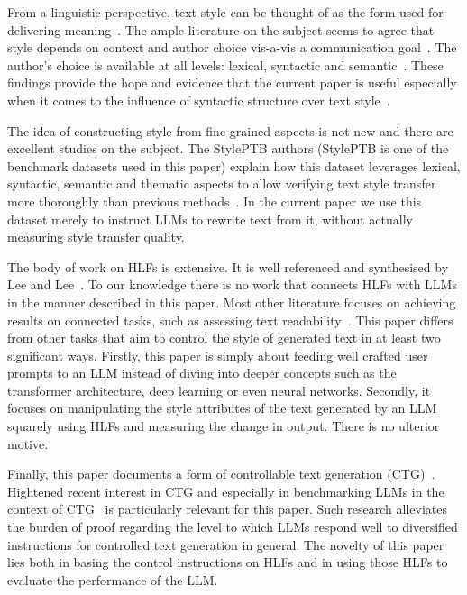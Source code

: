 \documentclass[runningheads,a4paper,11pt]{article}
\begin{document}
From a linguistic perspective, text style can be thought of as the form used for
delivering meaning~\cite{tst_sigkdd_review_2022}.
The ample literature on the subject seems to agree that style depends on context
and author choice vis-a-vis a communication
goal~\cite{mcdonald1985computational,hovy1987generating}.
The author's choice is available at all levels: lexical, syntactic and
semantic~\cite{dimarco1994model}.
These findings provide the hope and evidence that the current paper is useful
especially when it comes to the influence of syntactic structure over text
style~\cite{chomsky2002syntactic}.

The idea of constructing style from fine-grained aspects is not new and there
are excellent studies on the subject. The StylePTB authors (StylePTB is one of
the benchmark datasets used in this paper) explain how this dataset leverages
lexical, syntactic, semantic and thematic aspects to allow verifying text style
transfer more thoroughly than previous methods~\cite{lyu-etal-2021-styleptb}.
In the current paper we use this dataset merely to instruct LLMs to rewrite text
from it, without actually measuring style transfer quality.

The body of work on HLFs is extensive.
It is well referenced and synthesised by Lee and Lee~\cite{lftk-2023}.
To our knowledge there is no work that connects HLFs with LLMs in the manner
described in this paper.
Most other literature focuses on achieving results on connected tasks, such as
assessing text readability~\cite{lee-etal-2021-pushing}.
This paper differs from other tasks that aim to control the style of generated
text in at least two significant ways.
Firstly, this paper is simply about feeding well crafted user prompts to an LLM
instead of diving into deeper concepts such as the transformer architecture,
deep learning or even neural networks.
Secondly, it focuses on manipulating the style attributes of the text generated
by an LLM squarely using HLFs and measuring the change in output.
There is no ulterior motive.

Finally, this paper documents a form of controllable text generation (CTG)~\cite{zhang-ctg-2022}.
Hightened recent interest in CTG and especially in benchmarking LLMs in the
context of CTG~\cite{chen2024benchmarking} is particularly relevant for this
paper.
Such research alleviates the burden of proof regarding the level to which
LLMs respond well to diversified instructions for controlled text generation in
general.
The novelty of this paper lies both in basing the control instructions on
HLFs and in using those HLFs to evaluate the performance of the LLM.
\end{document}
